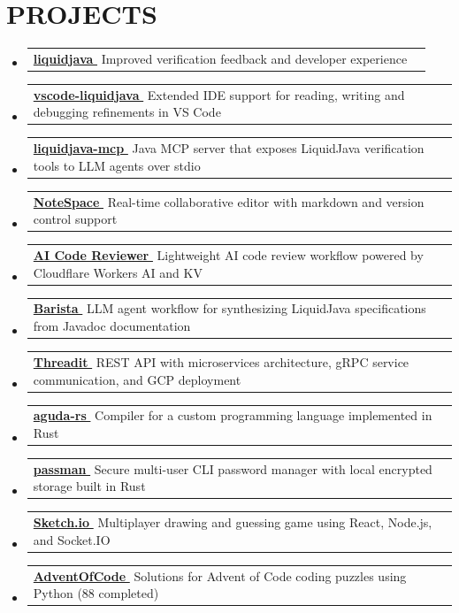 \documentclass[letterpaper,11pt]{article}
\makeatletter
\let\oldhref\href
\renewcommand{\href}[2]{\oldhref{#1}{#2\,{\color{dark-grey}\scriptsize\faLink}}}
\newcommand{\resumeProjectHeading}[2]{
    \item
    \begin{tabular*}{\textwidth}{l@{\extracolsep{\fill}}r}
      #1 & {\color{dark-grey}} \\
    \end{tabular*}\vspace{-4pt}
}
\newcommand{\resumeSubHeadingListStart}{\begin{itemize}[leftmargin=0in, label={}]}
\newcommand{\resumeSubHeadingListEnd}{\end{itemize}}
\makeatother
\begin{document}
\section{PROJECTS}
    \resumeSubHeadingListStart
      \resumeProjectHeading
          {\textbf{\href{https://github.com/liquid-java/liquidjava}{liquidjava}} \textbar{} Improved verification feedback and developer experience}{}
      \resumeProjectHeading
          {\textbf{\href{https://github.com/liquid-java/vscode-liquidjava}{vscode-liquidjava}} \textbar{} Extended IDE support for reading, writing and debugging refinements in VS Code}{}
      \resumeProjectHeading
          {\textbf{\href{https://github.com/liquid-java/liquidjava-mcp}{liquidjava-mcp}} \textbar{} Java MCP server that exposes LiquidJava verification tools to LLM agents over stdio}{}
      \resumeProjectHeading
          {\textbf{\href{https://github.com/NoteSpaceTeam/NoteSpace}{NoteSpace}} \textbar{} Real-time collaborative editor with markdown and version control support}{}
      \resumeProjectHeading
        {\textbf{\href{https://github.com/rcosta358/cf_ai_code_reviewer}{AI Code Reviewer}} \textbar{} Lightweight AI code review workflow powered by Cloudflare Workers AI and KV}{}
      \resumeProjectHeading
        {\textbf{\href{https://rcosta358.github.io/barista-ase-26.pdf}{Barista}} \textbar{} LLM agent workflow for synthesizing LiquidJava specifications from Javadoc documentation}{}
      \resumeProjectHeading
        {\textbf{\href{https://github.com/ThreaditApp/Threadit}{Threadit}} \textbar{} REST API with microservices architecture, gRPC service communication, and GCP deployment}{}
      \resumeProjectHeading
          {\textbf{\href{https://github.com/rcosta358/aguda-rs}{aguda-rs}} \textbar{} Compiler for a custom programming language implemented in Rust}{}
      \resumeProjectHeading
          {\textbf{\href{https://github.com/rcosta358/passman}{passman}} \textbar{} Secure multi-user CLI password manager with local encrypted storage built in Rust}{}
      \resumeProjectHeading
          {\textbf{\href{https://github.com/Programmaters/Sketch.io}{Sketch.io}} \textbar{} Multiplayer drawing and guessing game using React, Node.js, and Socket.IO}{}
      \resumeProjectHeading
          {\textbf{\href{https://github.com/rcosta358/AdventOfCode}{AdventOfCode}} \textbar{} Solutions for Advent of Code coding puzzles using Python (88 completed)}{}
    \resumeSubHeadingListEnd

\end{document}
